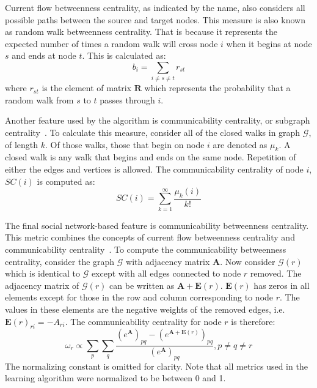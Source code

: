 \documentclass[12pt]{report}
\begin{document}
Current flow betweenness centrality, as indicated by the name, also considers all possible paths between the source and target nodes.
This measure is also known as random walk betweenness centrality.
That is because it represents the expected number of times a random walk will cross node ${i}$ when it begins at node ${s}$ and ends at node ${t}$.
This is calculated as:
\begin{equation}
b_i = \sum_{i\neq s\neq t} r_{st}
\end{equation}
where $r_{st}$ is the element of matrix $\boldsymbol{R}$ which represents the probability that a random walk from $s$ to $t$ passes through $i$.

Another feature used by the algorithm is communicability centrality, or subgraph centrality~\cite{Estrada_2005}.  
To calculate this measure, consider all of the closed walks in graph $\mathcal{G}$, of length $k$.
Of those walks, those that begin on node $i$ are denoted as $\mu_k$.
A closed walk is any walk that begins and ends on the same node.
Repetition of either the edges and vertices is allowed.
The communicability centrality of node $i$, $SC(i)$ is computed as:
\begin{equation}
SC(i) = \sum_{k=1}^\infty \frac{\mu_k(i)}{k!}
\end{equation}

The final social network-based feature is 
communicability betweenness centrality.
This metric combines the concepts of current flow betweenness centrality and communicability centrality~\cite{estrada2008communicability}.
To compute the communicability betweenness centrality, consider the graph $\mathcal{G}$  with adjacency matrix $\boldsymbol{A}$.
Now consider $\mathcal{G}(r)$ which is identical to $\mathcal{G}$ except with all edges connected to node $r$ removed.
The adjacency matrix of $\mathcal{G}(r)$ can be written as $\boldsymbol{A}+\boldsymbol{E}(r)$.
$\boldsymbol{E}(r)$ has zeros in all elements except for those in the row and column corresponding to node $r$.
The values in these elements are the negative weights of the removed edges, i.e. $\boldsymbol{E}(r)_{ri} = -A_{ri}$.
The communicability centrality for node $r$ is therefore:
\begin{equation}
\omega_r \propto \sum_{p}\sum_{q} \frac{\left(e^{\boldsymbol{A}} \right)_{pq} - \left(e^{\boldsymbol{A}+\boldsymbol{E}(r)} \right)_{pq}}{\left(e^{\boldsymbol{A}}\right)_{pq}}, p\neq q \neq r
\end{equation}
The normalizing constant is omitted for clarity.
Note that all metrics used in the learning algorithm were normalized to be between 0 and 1.
\end{document}
